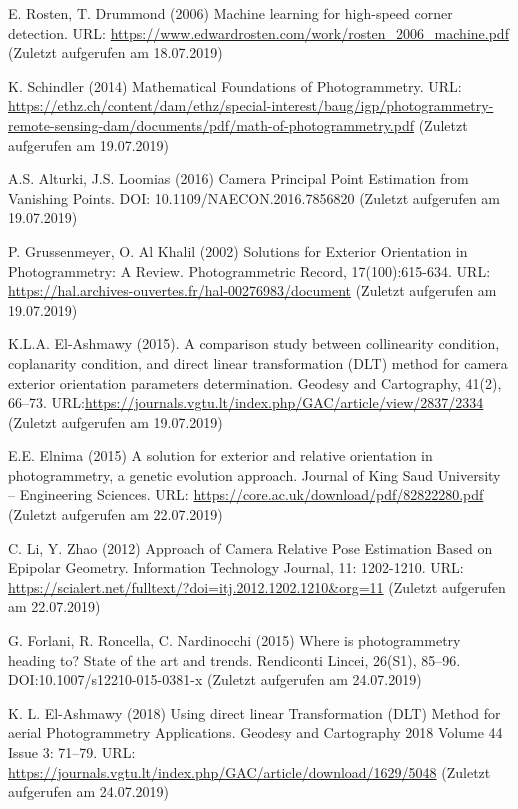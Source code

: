 \documentclass[12pt,oneside]{scrreprt}
\begin{document}
\begin{thebibliography}{10}
 E. Rosten, T. Drummond (2006) Machine learning for high-speed corner detection. URL: \url{https://www.edwardrosten.com/work/rosten_2006_machine.pdf} (Zuletzt aufgerufen am 18.07.2019)

 K. Schindler (2014) Mathematical Foundations of
Photogrammetry. URL: \url{https://ethz.ch/content/dam/ethz/special-interest/baug/igp/photogrammetry-remote-sensing-dam/documents/pdf/math-of-photogrammetry.pdf} (Zuletzt aufgerufen am 19.07.2019)

 A.S. Alturki, J.S. Loomias (2016) Camera Principal Point Estimation from Vanishing Points. DOI: 10.1109/NAECON.2016.7856820 (Zuletzt aufgerufen am 19.07.2019)

 P. Grussenmeyer, O. Al Khalil (2002) Solutions for Exterior Orientation in Photogrammetry: A Review. Photogrammetric Record, 17(100):615-634. URL: \url{https://hal.archives-ouvertes.fr/hal-00276983/document} (Zuletzt aufgerufen am 19.07.2019)

 K.L.A. El-Ashmawy (2015). A comparison study between collinearity condition, coplanarity condition, and direct linear transformation (DLT) method for camera exterior orientation parameters determination. Geodesy and Cartography, 41(2), 66–73. URL:\url{https://journals.vgtu.lt/index.php/GAC/article/view/2837/2334} (Zuletzt aufgerufen am 19.07.2019)

 E.E. Elnima (2015) A solution for exterior and relative orientation
in photogrammetry, a genetic evolution approach. Journal of King Saud University – Engineering Sciences. URL: \url{https://core.ac.uk/download/pdf/82822280.pdf}  (Zuletzt aufgerufen am 22.07.2019)

 C. Li, Y. Zhao (2012) Approach of Camera Relative Pose Estimation Based on Epipolar Geometry. Information Technology Journal, 11: 1202-1210. URL: \url{https://scialert.net/fulltext/?doi=itj.2012.1202.1210&org=11} (Zuletzt aufgerufen am 22.07.2019)

 G. Forlani, R. Roncella, C. Nardinocchi (2015) Where is photogrammetry heading to? State of the art and trends. Rendiconti Lincei, 26(S1), 85–96. DOI:10.1007/s12210-015-0381-x  (Zuletzt aufgerufen am 24.07.2019)

 K. L. El-Ashmawy (2018) Using direct linear Transformation (DLT) Method for
aerial Photogrammetry Applications. Geodesy and Cartography 2018 Volume 44 Issue 3: 71–79. URL: \url{https://journals.vgtu.lt/index.php/GAC/article/download/1629/5048} (Zuletzt aufgerufen am 24.07.2019)


\end{thebibliography}
\end{document}
